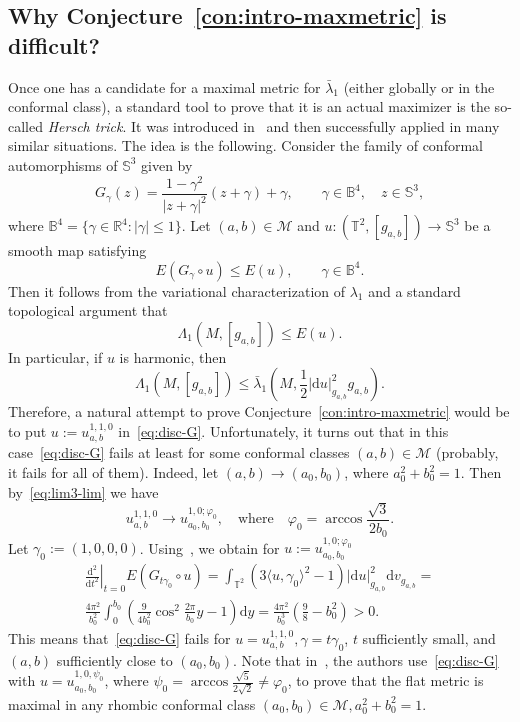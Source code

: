 \documentclass{amsart}
\let\le\leqslant
\let\phi\varphi
\renewcommand{\d}{\mathrm{d}}
\theoremstyle{plain}
\theoremstyle{definition}
\theoremstyle{remark}
\begin{document}
\subsection{Why Conjecture~\ref{con:intro-maxmetric} is difficult?}

Once one has a candidate for a maximal metric for \(\bar\lambda_1\) (either
globally or in the conformal class), a standard tool to prove that it is an
actual maximizer is the so-called \emph{Hersch trick}. It was introduced
in~\cite{Her1970} and then successfully applied in many similar situations. The
idea is the following. Consider the family of conformal automorphisms of
\(\mathbb S^3\) given by
\[
G_\gamma(z)=\frac{1-\gamma^2}{|z+\gamma|^2}(z+\gamma)+\gamma,\qquad
\gamma\in\mathbb B^4,\quad z\in\mathbb S^3,
\]
where \(\mathbb B^4=\{\gamma\in\mathbb R^4\colon |\gamma|\le 1\}\). Let
\((a,b)\in\mathcal M\) and \(u\colon (\mathbb T^2,[g_{a,b}])\to\mathbb S^3\) be
a smooth map satisfying
\begin{equation}\label{eq:disc-G}
E(G_\gamma\circ u)\le E(u),\qquad\gamma\in\mathbb B^4.
\end{equation}
Then it follows from the variational characterization of \(\lambda_1\) and a
standard topological argument that
\[
\Lambda_1(M,[g_{a,b}])\le E(u).
\]
In particular, if \(u\) is harmonic, then
\[
\Lambda_1(M,[g_{a,b}])\le\bar\lambda_1(M,\frac{1}2 |\d u|_{g_{a,b}}^2 g_{a,b}).
\]
Therefore, a natural attempt to prove Conjecture~\ref{con:intro-maxmetric} would
be to put \(u:=u_{a,b}^{1,1,0}\) in~\eqref{eq:disc-G}. Unfortunately, it turns
out that in this case~\eqref{eq:disc-G} fails at least for some conformal
classes \((a,b)\in\mathcal M\) (probably, it fails for all of them). Indeed, let
\((a,b)\to (a_0,b_0)\), where \(a_0^2+b_0^2=1\). Then by~\eqref{eq:lim3-lim} we
have
\[
u_{a,b}^{1,1,0}\to u_{a_0,b_0}^{1,0;\phi_0},\quad\text{where}\quad
\phi_0=\arccos\frac{\sqrt 3}{2b_0}.
\]
Let \(\gamma_0:=(1,0,0,0)\). Using~\cite[(1.7)]{MR1986}, we obtain for
\(u:=u_{a_0,b_0}^{1,0;\phi_0}\)
\begin{multline*}
\left.\frac{\d^2}{\d t^2}\right|_{t=0}E(G_{t\gamma_0}\circ u)=
\int_{\mathbb T^2} (3\langle u,\gamma_0\rangle^2-1)
|\d u|_{g_{a,b}}^2\d v_{g_{a,b}}=\\
\frac{4\pi^2}{b_0^2}\int_0^{b_0}
\left(\frac{9}{4b_0^2}\cos^2\frac{2\pi}{b_0} y-1\right)\d y=
\frac{4\pi^2}{b_0^3}\left(\frac{9}8-b_0^2\right)>0.
\end{multline*}
This means that~\eqref{eq:disc-G} fails for
\(u=u_{a,b}^{1,1,0},\gamma=t\gamma_0\), \(t\) sufficiently small, and \((a,b)\)
sufficiently close to \((a_0,b_0)\). Note that in~\cite{ElSIR1996}, the authors
use~\eqref{eq:disc-G} with \(u=u_{a_0,b_0}^{1,0,\psi_0}\), where
\(\psi_0=\arccos\frac{\sqrt 5}{2\sqrt 2}\ne\phi_0\), to prove that the flat
metric is maximal in any rhombic conformal class \((a_0,b_0)\in\mathcal
M,a_0^2+b_0^2=1\).
\end{document}
